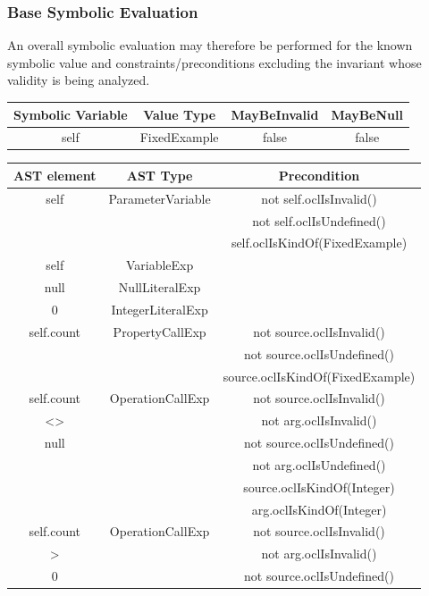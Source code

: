 \documentclass{llncs}
\begin{document}
\subsubsection{Base Symbolic Evaluation}

An overall symbolic evaluation may therefore be performed for the known symbolic value and constraints/preconditions excluding the invariant whose validity is being analyzed.
\begin{center}
	\begin{tabular}{|c||c|c||c|}
		\hline
		Symbolic Variable & Value Type & MayBeInvalid & MayBeNull \\
		\hline
		self & FixedExample & false & false \\
		\hline
	\end{tabular}
\end{center}
\begin{center}
	\begin{tabular}{|c|c||c|}
		\hline
		AST element & AST Type & Precondition \\
		\hline
		\hline
		self & ParameterVariable & not self.oclIsInvalid() \\
		&& not self.oclIsUndefined() \\
		&& self.oclIsKindOf(FixedExample) \\
 		\hline
		self & VariableExp & \\
 		\hline
		null & NullLiteralExp & \\
 		\hline
		0 & IntegerLiteralExp & \\
		\hline
		self.count & PropertyCallExp & not source.oclIsInvalid() \\
		&& not source.oclIsUndefined() \\
		&& source.oclIsKindOf(FixedExample) \\
 		\hline
		self.count & OperationCallExp & not source.oclIsInvalid() \\
		<> && not arg.oclIsInvalid() \\
		null && not source.oclIsUndefined() \\
		&& not arg.oclIsUndefined() \\
		&& source.oclIsKindOf(Integer) \\
		&& arg.oclIsKindOf(Integer) \\
 		\hline
        self.count & OperationCallExp & not source.oclIsInvalid() \\
		> && not arg.oclIsInvalid() \\
		0 && not source.oclIsUndefined() \\

\end{tabular}
\end{center}
\end{document}

